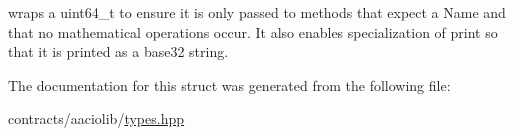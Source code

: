 wraps a uint64\+\_\+t to ensure it is only passed to methods that expect a Name and that no mathematical operations occur. It also enables specialization of print so that it is printed as a base32 string. 

The documentation for this struct was generated from the following file\+:\begin{DoxyCompactItemize}
\item 
contracts/aaciolib/\mbox{\hyperlink{contracts_2aaciolib_2types_8hpp}{types.\+hpp}}\end{DoxyCompactItemize}

